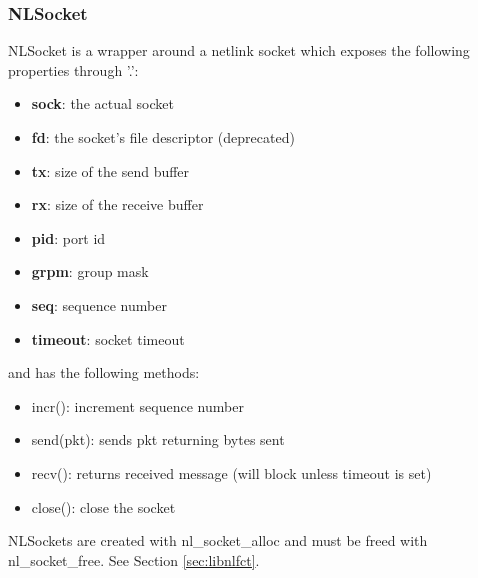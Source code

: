\documentclass[11pt]{article}
\begin{document}
\begin{appendices}
\subsubsection{NLSocket}
NLSocket is a wrapper around a netlink socket which exposes the following 
properties through '.':
\begin{itemize}
\item \textbf{sock}: the actual socket
\item \textbf{fd}: the socket's file descriptor (deprecated)
\item \textbf{tx}: size of the send buffer
\item \textbf{rx}: size of the receive buffer
\item \textbf{pid}: port id
\item \textbf{grpm}: group mask 
\item \textbf{seq}: sequence number
\item \textbf{timeout}: socket timeout
\end{itemize}
and has the following methods:
\begin{itemize}
\item incr(): increment sequence number
\item send(pkt): sends pkt returning bytes sent
\item recv(): returns received message (will block unless timeout is set)
\item close(): close the socket
\end{itemize}

NLSockets are created with nl\_socket\_alloc and must be freed with nl\_socket\_free.
See Section \ref{sec:libnlfct}.


\end{appendices}
\end{document}
